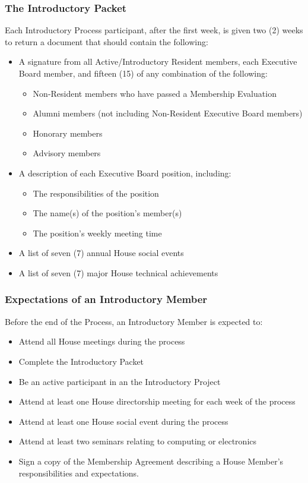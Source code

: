 \documentclass{article}
\newcommand{\bsubsection}[1]{\subsubsection{#1} \label{#1}}
\begin{document}
\bsubsection{The Introductory Packet}
Each Introductory Process participant, after the first week, is given two (2) weeks to return a document that should contain the following:
\begin{itemize}
	\item A signature from all Active/Introductory Resident members, each Executive Board member, and fifteen (15) of any combination of the following:
	\begin{itemize}
		\item Non-Resident members who have passed a Membership Evaluation 
		\item Alumni members (not including Non-Resident Executive Board members)
		\item Honorary members
		\item Advisory members
	\end{itemize}
	\item A description of each Executive Board position, including:
	\begin{itemize}
		\item The responsibilities of the position
		\item The name(s) of the position’s member(s)
		\item The position’s weekly meeting time
	\end{itemize}
	\item A list of seven (7) annual House social events
	\item A list of seven (7) major House technical achievements
\end{itemize}
\bsubsection{Expectations of an Introductory Member}
Before the end of the Process, an Introductory Member is expected to:
\begin{itemize}
\item Attend all House meetings during the process
\item Complete the Introductory Packet
\item Be an active participant in an the Introductory Project
\item Attend at least one House directorship meeting for each week of the process
\item Attend at least one House social event during the process
\item Attend at least two seminars relating to computing or electronics
\item Sign a copy of the Membership Agreement describing a House Member’s responsibilities and expectations.
\end{itemize}
\end{document}
